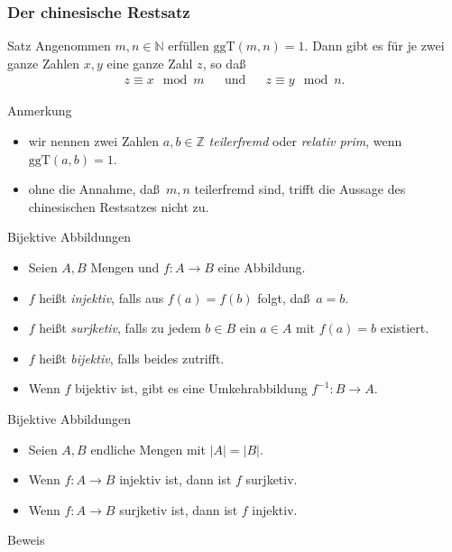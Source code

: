 \documentclass{beamer}
\renewcommand{\emph}[1]{{\textcolor{solarizedRed}{\itshape #1}}}
\newcommand\NN{\mathbb N}
\newcommand\ZZ{\mathbb Z}
\newcommand{\ggt}{\mathrm{ggT}}
\newcommand{\ue}{\"u}
\begin{document}
\begin{frame}\frametitle{Der chinesische Restsatz}
	\begin{block}{Satz}
		Angenommen $m,n\in\NN$ erf\ue llen $\ggt(m,n)=1$.	
		Dann gibt es f\ue r je zwei ganze Zahlen $x,y$ eine ganze Zahl $z$, so da\ss\
		\begin{align*}
			z\equiv x\mod m&&\mbox{und}&&z\equiv y\mod n.
		\end{align*}
	\end{block}
	\begin{overprint}
		\begin{block}{Anmerkung}
			\begin{itemize}
				\item wir nennen zwei Zahlen $a,b\in\ZZ$ \emph{teilerfremd} oder \emph{relativ prim}, wenn $\ggt(a,b)=1$.
				\item ohne die Annahme, da\ss\ $m,n$ teilerfremd sind, trifft die Aussage des chinesischen Restsatzes nicht zu.
			\end{itemize}	
		\end{block}
		\begin{block}{Bijektive Abbildungen}
			\begin{itemize}
				\item Seien $A,B$ Mengen und $f:A\to B$ eine Abbildung.
				\item $f$ hei\ss t \emph{injektiv}, falls aus $f(a)=f(b)$ folgt, da\ss\ $a=b$.
				\item $f$ hei\ss t \emph{surjketiv}, falls zu jedem $b\in B$ ein $a\in A$ mit $f(a)=b$ existiert.
				\item $f$ hei\ss t \emph{bijektiv}, falls beides zutrifft.
				\item Wenn $f$ bijektiv ist, gibt es eine Umkehrabbildung $f^{-1}:B\to A$.
			\end{itemize}
		\end{block}
		\begin{block}{Bijektive Abbildungen}
			\begin{itemize}
				\item Seien $A,B$ endliche Mengen mit $|A|=|B|$.
				\item Wenn $f:A\to B$ injektiv ist, dann ist $f$ surjketiv.
				\item Wenn $f:A\to B$ surjketiv ist, dann ist $f$ injektiv.
			\end{itemize}
		\end{block}
		\begin{block}{Beweis}

\end{block}
\end{overprint}
\end{frame}
\end{document}

